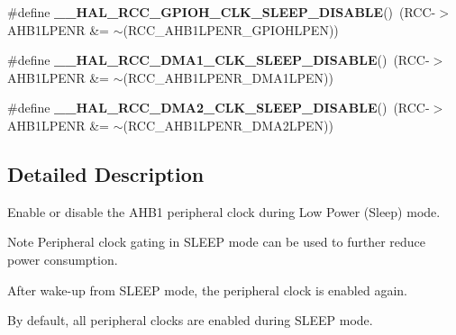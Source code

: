 \begin{DoxyCompactItemize}
\item 
\mbox{\label{group___r_c_c___a_h_b1___low_power___enable___disable_ga3150a9552cca2ec7e0f00d799fc52adb}} 
\#define {\bfseries \+\_\+\+\_\+\+H\+A\+L\+\_\+\+R\+C\+C\+\_\+\+G\+P\+I\+O\+H\+\_\+\+C\+L\+K\+\_\+\+S\+L\+E\+E\+P\+\_\+\+D\+I\+S\+A\+B\+LE}()~(R\+CC-\/$>$A\+H\+B1\+L\+P\+E\+NR \&= $\sim$(R\+C\+C\+\_\+\+A\+H\+B1\+L\+P\+E\+N\+R\+\_\+\+G\+P\+I\+O\+H\+L\+P\+EN))
\item 
\mbox{\label{group___r_c_c___a_h_b1___low_power___enable___disable_ga8786d21490439ef0564edff087203245}} 
\#define {\bfseries \+\_\+\+\_\+\+H\+A\+L\+\_\+\+R\+C\+C\+\_\+\+D\+M\+A1\+\_\+\+C\+L\+K\+\_\+\+S\+L\+E\+E\+P\+\_\+\+D\+I\+S\+A\+B\+LE}()~(R\+CC-\/$>$A\+H\+B1\+L\+P\+E\+NR \&= $\sim$(R\+C\+C\+\_\+\+A\+H\+B1\+L\+P\+E\+N\+R\+\_\+\+D\+M\+A1\+L\+P\+EN))
\item 
\mbox{\label{group___r_c_c___a_h_b1___low_power___enable___disable_ga6af5c50e1a578bcc17c9514c5ab976c9}} 
\#define {\bfseries \+\_\+\+\_\+\+H\+A\+L\+\_\+\+R\+C\+C\+\_\+\+D\+M\+A2\+\_\+\+C\+L\+K\+\_\+\+S\+L\+E\+E\+P\+\_\+\+D\+I\+S\+A\+B\+LE}()~(R\+CC-\/$>$A\+H\+B1\+L\+P\+E\+NR \&= $\sim$(R\+C\+C\+\_\+\+A\+H\+B1\+L\+P\+E\+N\+R\+\_\+\+D\+M\+A2\+L\+P\+EN))
\end{DoxyCompactItemize}


\subsection{Detailed Description}
Enable or disable the A\+H\+B1 peripheral clock during Low Power (Sleep) mode. 

\begin{DoxyNote}{Note}
Peripheral clock gating in S\+L\+E\+EP mode can be used to further reduce power consumption. 

After wake-\/up from S\+L\+E\+EP mode, the peripheral clock is enabled again. 

By default, all peripheral clocks are enabled during S\+L\+E\+EP mode. 
\end{DoxyNote}
